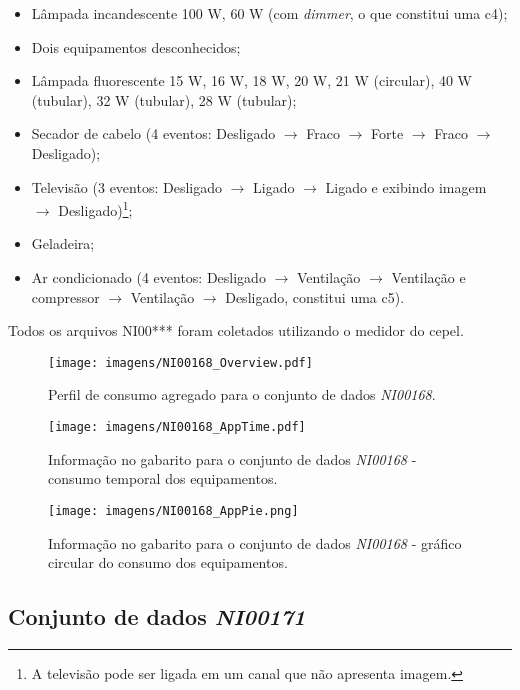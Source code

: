 \begin{itemize}
\item Lâmpada incandescente 100 W, 60 W (com \emph{dimmer},
o que constitui uma \acs{c4});
\item Dois equipamentos desconhecidos;
\item Lâmpada fluorescente 15 W, 16 W, 18 W, 20 W, 21 W (circular),
40 W (tubular), 32 W (tubular), 28 W (tubular);
\item Secador de cabelo (4 eventos: Desligado $\rightarrow$ Fraco
$\rightarrow$ Forte $\rightarrow$ Fraco $\rightarrow$ Desligado);
\item Televisão (3 eventos: Desligado $\rightarrow$ Ligado
$\rightarrow$ Ligado e exibindo imagem $\rightarrow$
Desligado)\footnote{A televisão pode ser ligada em um canal que não
apresenta imagem.};
\item Geladeira;
\item Ar condicionado (4 eventos: Desligado $\rightarrow$ Ventilação
$\rightarrow$ Ventilação e compressor $\rightarrow$ Ventilação
$\rightarrow$ Desligado, constitui uma \acs{c5}).
\end{itemize}

Todos os arquivos NI00*** foram coletados utilizando o medidor do
\acs{cepel}.

\begin{sidewaysfigure}[p]
\centering
\texttt{[image: imagens/NI00168\_Overview.pdf]}
\caption{Perfil de consumo agregado para o conjunto de dados
\emph{NI00168}.}
\label{fig:ni00168_overview}
\end{sidewaysfigure}

\begin{sidewaysfigure}[p]
\centering
\texttt{[image: imagens/NI00168\_AppTime.pdf]}
\caption{Informação no gabarito para o conjunto de dados
\emph{NI00168} - consumo temporal dos equipamentos.}
\label{fig:ni00168_app_time}
\end{sidewaysfigure}

\begin{sidewaysfigure}[p]
\centering
\texttt{[image: imagens/NI00168\_AppPie.png]}
\caption{Informação no gabarito para o conjunto de dados
\emph{NI00168} - gráfico circular do consumo dos equipamentos.}
\label{fig:ni00168_app_pie}
\end{sidewaysfigure}

\FloatBarrier
\subsection{Conjunto de dados \emph{NI00171}}

